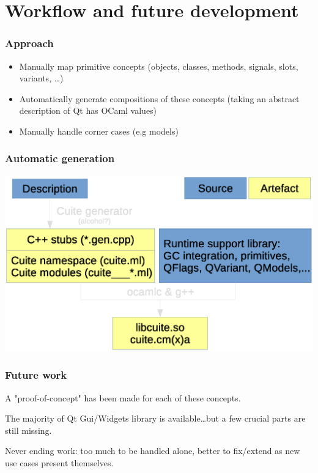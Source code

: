 \documentclass[serif,mathserif]{beamer}
\begin{document}
\section{Workflow and future development}

\begin{frame}
  \frametitle{Approach}

  \begin{itemize}
    \item Manually map primitive concepts (objects, classes, methods, signals,
      slots, variants, \ldots)
      \pause
    \item Automatically generate compositions of these concepts (taking an
      abstract description of Qt has OCaml values)
      \pause
    \item Manually handle corner cases (e.g models)
  \end{itemize}

\end{frame}

\begin{frame}
  \frametitle{Automatic generation}

  \includegraphics[width=\textwidth]{compilation_workflow}

\end{frame}

\begin{frame}
  \frametitle{Future work}

  A "proof-of-concept" has been made for each of these concepts.
  \pause

  The majority of Qt Gui/Widgets library is available\ldots but a few crucial
  parts are still missing.
  \pause

  Never ending work: too much to be handled alone, better to fix/extend as new
  use cases present themselves. 
\end{frame}
\end{document}
